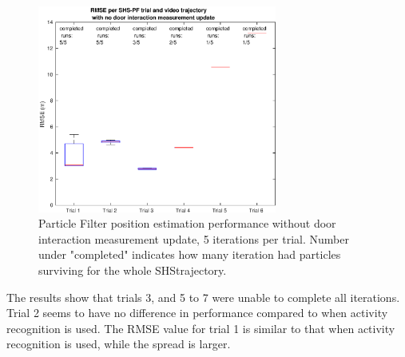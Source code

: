 \begin{figure}[H]
	\centering
	\includegraphics[width=0.7\textwidth]{images/20201129_1438_RMSE_with_no_door_interaction_1}
	\caption[Particle Filter position estimation performance without door interaction]{Particle Filter position estimation performance without door interaction measurement update, 5 iterations per trial. Number under "completed" indicates how many iteration had particles surviving for the whole \ac{SHS}trajectory.}
	\label{fig:pf_boxplot_no_doors}
\end{figure}

The results show that trials 3, and 5 to 7 were unable to complete all iterations. Trial 2 seems to have no difference in performance compared to when activity recognition is used. The RMSE value for trial 1 is similar to that when activity recognition is used, while the spread is larger.